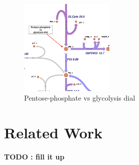 \documentclass[12pt,chapterheads]{ucsd}
\begin{document}
\begin{figure}[h] 
\centering
\includegraphics[width=0.4\textwidth]{dial_2}
\caption[Pentose-phosphate vs glycolysis dial]
{Pentose-phosphate vs glycolysis dial}
\label{fig:dial_2}
\end{figure}

\chapter{Related Work}
\textbf{TODO : fill it up}\\
\end{document}
